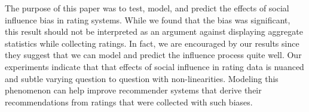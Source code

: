 The purpose of this paper was to test, model, and predict the effects of social influence bias in rating systems.
While we found that the bias was significant, this result should not be interpreted as an argument against displaying aggregate statistics while collecting ratings.
In fact, we are encouraged by our results since they suggest that we can model and predict the influence process quite well.
Our experiments indicate that that effects of social influence in rating data is nuanced and subtle varying question to question with non-linearities.
Modeling this phenomenon can help improve recommender systems that derive their recommendations from ratings that were collected with such biases.
